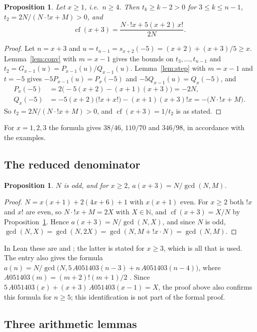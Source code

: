 \documentclass[11pt]{amsart}
\theoremstyle{plain}
\newtheorem{proposition}[theorem]{Proposition}
\theoremstyle{definition}
\newcommand{\N}{\mathbb{N}}
\newcommand{\lf}{\mathop{!}}
\DeclareMathOperator{\cf}{cf}
\begin{document}
\begin{proposition}\label{prop:closed}
Let $x\ge1$, i.e.\ $n\ge4$. Then $t_k\ge k-2>0$ for $3\le k\le n-1$, $t_2=2N/(N\cdot{\lf x}+M)>0$, and
\[
  \cf(x+3)=\frac{N\cdot\lf x+5(x+2)\,x!}{2N}.
\]
\end{proposition}

\begin{proof}
Let $n=x+3$ and $u=t_{n-1}=s_{x+2}(-5)=(x+2)+(x+3)/5\ge x$. Lemma~\ref{lem:conv} with $m=x-1$ gives the bounds on $t_3,\dots,t_{n-1}$ and $t_2=G_{x-1}(u)=P_{x-1}(u)/Q_{x-1}(u)$. Lemma~\ref{lem:step} with $m=x-1$ and $t=-5$ gives $-5P_{x-1}(u)=P_x(-5)$ and $-5Q_{x-1}(u)=Q_x(-5)$, and
\begin{align*}
  P_x(-5)&=2\bigl(-5(x+2)-(x+1)(x+3)\bigr)=-2N,\\
  Q_x(-5)&=-5(x+2)\bigl(\lf x+x!\bigr)-(x+1)(x+3)\lf x=-\bigl(N\cdot{\lf x}+M\bigr).
\end{align*}
So $t_2=2N/(N\cdot{\lf x}+M)>0$, and $\cf(x+3)=1/t_2$ is as stated.
\end{proof}

For $x=1,2,3$ the formula gives $38/46$, $110/70$ and $346/98$, in accordance with the examples.

\subsection{The reduced denominator}

\begin{proposition}\label{prop:den}
$N$ is odd, and for $x\ge2$, $a(x+3)=N/\gcd(N,M)$.
\end{proposition}

\begin{proof}
$N=x(x+1)+2(4x+6)+1$ with $x(x+1)$ even. For $x\ge2$ both $\lf x$ and $x!$ are even, so $N\cdot{\lf x}+M=2X$ with $X\in\N$, and $\cf(x+3)=X/N$ by Proposition~\ref{prop:closed}. Hence $a(x+3)=N/\gcd(N,X)$, and since $N$ is odd,
$\gcd(N,X)=\gcd(N,2X)=\gcd(N,M+\lf x\cdot N)=\gcd(N,M)$.
\end{proof}

In Lean these are  and ; the latter is stated for $x\ge3$, which is all that is used.
The entry also gives the formula $a(n)=N/\gcd\bigl(N,5\,A051403(n-3)+n\,A051403(n-4)\bigr)$, where $A051403(m)=(m+2)\lf(m+1)/2$ \cite{A051403}. Since $5\,A051403(x)+(x+3)\,A051403(x-1)=X$, the proof above also confirms this formula for $n\ge5$; this identification is not part of the formal proof.

\subsection{Three arithmetic lemmas}
\end{document}
